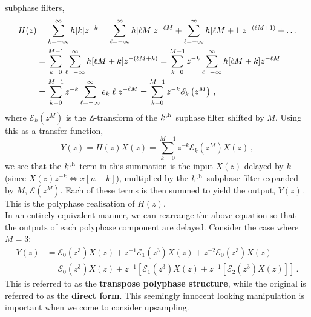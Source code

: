 subphase filters,
%
\begin{align*}
  H(z) &= \sum_{k=-\infty}^\infty h[k]z^{-k}
  = \sum_{\ell=-\infty}^\infty h[\ell M]z^{-\ell M} + \sum_{\ell=-\infty}^\infty h[\ell M+1]z^{-(\ell M + 1)} + \hdots \\
  &= \sum_{k=0}^{M-1}\sum_{\ell=-\infty}^\infty h[\ell M + k]z^{-(\ell M + k)}
  = \sum_{k=0}^{M-1}z^{-k}\sum_{\ell=-\infty}^\infty h[\ell M + k]z^{-\ell M} \\
  &= \sum_{k=0}^{M-1}z^{-k} \sum_{\ell=-\infty}^\infty e_k[\ell]z^{-\ell M}
  = \sum_{k=0}^{M-1}z^{-k}\mathscr{E}_k\left(z^M\right) \,,
\end{align*}
%
where $\mathscr{E}_k\left(z^M\right)$ is the Z-transform of the $k^\mathrm{th}\mkern1mu$ suphase filter
shifted by $M$. Using this as a transfer function,
%
\begin{displaymath}
  Y(z) = H(z)X(z) = \sum_{k=0}^{M-1}z^{-k}\mathscr{E}_k\left(z^M\right)X(z) \,,
\end{displaymath}
%
we see that the $k^\mathrm{th}\mkern1mu$ term in this summation is the input $X(z)$ delayed by $k$ (since
$X(z)z^{-k} \Longleftrightarrow x[n-k]$), multiplied by the $k^\mathrm{th}\mkern1mu$ subphase filter expanded
by $M$, $\mathscr{E}\left(z^M\right)$. Each of these terms is then summed to yield the
output, $Y(z)$. This is the \textrm{polyphase realisation} of $H(z)$.\\
%
In an entirely equivalent manner, we can rearrange the above equation so that the
outputs of each polyphase component are delayed. Consider the case where $M=3$:
%
\begin{align*}
  Y(z) &= \mathscr{E}_0\left(z^3\right)X(z) + z^{-1}\mathscr{E}_1\left(z^3\right)X(z)
  + z^{-2}\mathscr{E}_0\left(z^3\right)X(z) \\
  &= \mathscr{E}_0\left(z^3\right)X(z) + z^{-1}\left[
    \mathscr{E}_1\left(z^3\right)X(z) + z^{-1}\left[
      \mathscr{E}_2\left(z^3\right)X(z)
      \right]\right] \,.
\end{align*}
%
This is referred to as the \textbf{transpose polyphase structure}, while the original
is referred to as the \textbf{direct form}. This seemingly innocent looking manipulation
is important when we come to consider upsampling.\\


